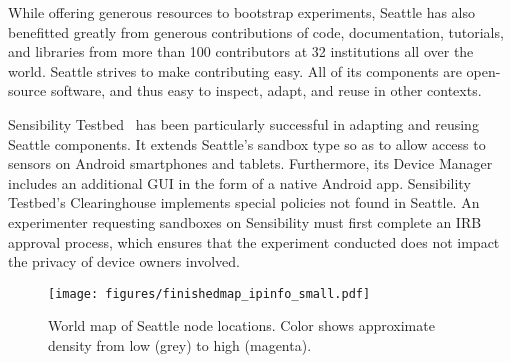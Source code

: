 While offering generous resources to bootstrap experiments,
Seattle has also benefitted greatly from generous contributions
of code, documentation, tutorials, and libraries from more than 100
contributors at 32 institutions all over the world.
Seattle strives to make contributing easy. All of its components
are open-source software, and thus easy to inspect, adapt, and
reuse in other contexts.

Sensibility Testbed~\cite{zhuang2014sensibility} has been particularly
successful in adapting and reusing Seattle components. It extends
Seattle's sandbox type so as to allow access
to sensors on Android smartphones and tablets. Furthermore, its
Device Manager includes an additional \gls{GUI} in the form of
a native Android app. Sensibility Testbed's Clearinghouse implements
special policies not found in Seattle. An experimenter requesting
sandboxes on Sensibility must first complete
an \gls{IRB} approval process, which ensures that the experiment
conducted does not impact the privacy of device owners involved.


\begin{figure}
  \centering
  \texttt{[image: figures/finishedmap\_ipinfo\_small.pdf]}
  \caption{World map of Seattle node locations. Color shows approximate density from low (grey) to high (magenta).}
  \label{fig:map}
\end{figure}
